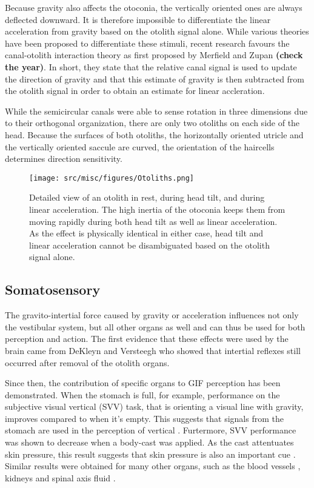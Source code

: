 Because gravity also affects the otoconia, the vertically oriented ones are always deflected downward. It is therefore impossible to differentiate the linear acceleration from gravity based on the otolith signal alone. While various theories have been proposed to differentiate these stimuli, recent research favours the canal-otolith interaction theory as first proposed by Merfield and Zupan \textbf{(check the year)}. In short, they state that the relative canal signal is used to update the direction of gravity and that this estimate of gravity is then subtracted from the otolith signal in order to obtain an estimate for linear accleration.

While the semicircular canals were able to sense rotation in three dimensions due to their orthogonal organization, there are only two otoliths on each side of the head. Because the surfaces of both otoliths, the horizontally oriented utricle and the vertically oriented saccule are curved, the orientation of the haircells determines direction sensitivity. 

\begin{figure}
    \texttt{[image: src/misc/figures/Otoliths.png]}
    \caption{Detailed view of an otolith  in rest,  during head tilt, and  during linear acceleration. The high inertia of the otoconia keeps them from moving rapidly during both head tilt as well as linear acceleration. As the effect is physically identical in either case, head tilt and linear acceleration cannot be disambiguated based on the otolith signal alone.}
    \label{intro:fig7}
\end{figure}


\subsection{Somatosensory}
The gravito-intertial force caused by gravity or acceleration influences not only the vestibular system, but all other organs as well and can thus be used for both perception and action. The first evidence that these effects were used by the brain came from DeKleyn and Versteegh \citeyear{dekleyn1933} who showed that intertial reflexes still occurred after removal of the otolith organs.

Since then, the contribution of specific organs to GIF perception has been demonstrated. When the stomach is full, for example, performance on the subjective visual vertical (SVV) task, that is orienting a visual line with gravity, improves compared to when it's empty. This suggests that signals from the stomach are used in the perception of vertical \cite{trousselard2004}. Furtermore, SVV performance was shown to decrease when a body-cast was applied. As the cast attentuates skin pressure, this result suggests that skin pressure is also an important cue \cite{trousselard2004}. Similar results were obtained for many other organs, such as the blood vessels \cite{vaitl2002}, kidneys and spinal axis fluid \cite{vaitl1997}.

